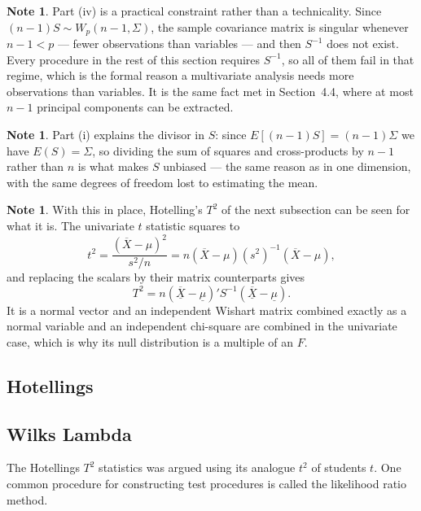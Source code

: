 \documentclass[11pt,a4paper]{article}
\theoremstyle{definition}
\newtheorem{note}[thm]{Note}
\begin{document}
\begin{note}
Part (iv) is a practical constraint rather than a technicality. Since
$(n-1)S\sim W_p(n-1,\Sigma)$, the sample covariance matrix is singular whenever
$n-1<p$ --- fewer observations than variables --- and then $S^{-1}$ does not
exist. Every procedure in the rest of this section requires $S^{-1}$, so all of
them fail in that regime, which is the formal reason a multivariate analysis
needs more observations than variables. It is the same fact met in
Section~4.4, where at most $n-1$ principal components can be extracted.
\end{note}

\begin{note}
Part (i) explains the divisor in $S$: since $E\left[(n-1)S\right] = (n-1)\Sigma$
we have $E(S)=\Sigma$, so dividing the sum of squares and cross-products by
$n-1$ rather than $n$ is what makes $S$ unbiased --- the same reason as in one
dimension, with the same degrees of freedom lost to estimating the mean.
\end{note}

\begin{note}
With this in place, Hotelling's $T^{2}$ of the next subsection can be seen for
what it is. The univariate $t$ statistic squares to
$$t^{2} = \frac{\left(\overline{X}-\mu\right)^{2}}{s^{2}/n}
= n\left(\overline{X}-\mu\right)\left(s^{2}\right)^{-1}\left(\overline{X}-\mu\right),$$
and replacing the scalars by their matrix counterparts gives
$$T^{2} = n\left(\overline{\underline{X}}-\underline{\mu}\right)'
S^{-1}\left(\overline{\underline{X}}-\underline{\mu}\right).$$
It is a normal vector and an independent Wishart matrix combined exactly as a
normal variable and an independent chi-square are combined in the univariate
case, which is why its null distribution is a multiple of an $F$.
\end{note}


\subsection{Hotellings}
\pagebreak






\subsection{Wilks Lambda}
The Hotellings $T^2$ statistics was argued using its analogue $t^2$  of students $t$. One common procedure for constructing test procedures is called the likelihood ratio method.\\
\end{document}
